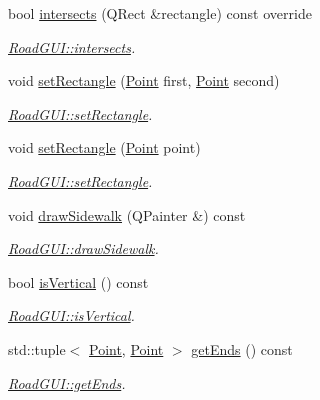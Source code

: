 \begin{DoxyCompactItemize}
\item 
bool \hyperlink{classRoadGUI_a32b9692ed94d6efe1d194f7ba35af7c5}{intersects} (Q\-Rect \&rectangle) const override
\begin{DoxyCompactList}\small\item\em \hyperlink{classRoadGUI_a32b9692ed94d6efe1d194f7ba35af7c5}{Road\-G\-U\-I\-::intersects}. \end{DoxyCompactList}\item 
void \hyperlink{classRoadGUI_aad20fd36c29dedd57ed07cce3c391677}{set\-Rectangle} (\hyperlink{classPoint}{Point} first, \hyperlink{classPoint}{Point} second)
\begin{DoxyCompactList}\small\item\em \hyperlink{classRoadGUI_aad20fd36c29dedd57ed07cce3c391677}{Road\-G\-U\-I\-::set\-Rectangle}. \end{DoxyCompactList}\item 
void \hyperlink{classRoadGUI_a9ba81129f297df4ea1f0cc47e68a21f5}{set\-Rectangle} (\hyperlink{classPoint}{Point} point)
\begin{DoxyCompactList}\small\item\em \hyperlink{classRoadGUI_aad20fd36c29dedd57ed07cce3c391677}{Road\-G\-U\-I\-::set\-Rectangle}. \end{DoxyCompactList}\item 
void \hyperlink{classRoadGUI_a4c9c5617846bdcf4033bc36cdab72ea2}{draw\-Sidewalk} (Q\-Painter \&) const 
\begin{DoxyCompactList}\small\item\em \hyperlink{classRoadGUI_a4c9c5617846bdcf4033bc36cdab72ea2}{Road\-G\-U\-I\-::draw\-Sidewalk}. \end{DoxyCompactList}\item 
bool \hyperlink{classRoadGUI_a6d2d17128a1aa200bc312778761be70a}{is\-Vertical} () const 
\begin{DoxyCompactList}\small\item\em \hyperlink{classRoadGUI_a6d2d17128a1aa200bc312778761be70a}{Road\-G\-U\-I\-::is\-Vertical}. \end{DoxyCompactList}\item 
std\-::tuple$<$ \hyperlink{classPoint}{Point}, \hyperlink{classPoint}{Point} $>$ \hyperlink{classRoadGUI_a8fc09e0061ce1e02be7a17e27861abd3}{get\-Ends} () const 
\begin{DoxyCompactList}\small\item\em \hyperlink{classRoadGUI_a8fc09e0061ce1e02be7a17e27861abd3}{Road\-G\-U\-I\-::get\-Ends}. \end{DoxyCompactList}\end{DoxyCompactItemize}
